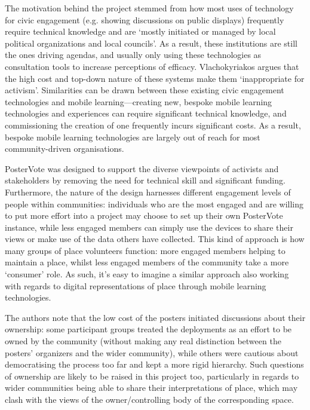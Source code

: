 The motivation behind the project stemmed from how most uses of technology for civic engagement (e.g. showing discussions on public displays) frequently require technical knowledge and are `mostly initiated or managed by local political organizations and local councils'. As a result, these institutions are still the ones driving agendas, and usually only using these technologies as consultation tools to increase perceptions of efficacy. Vlachokyriakos argues that the high cost and top-down nature of these systems make them `inappropriate for activism'. Similarities can be drawn between these existing civic engagement technologies and mobile learning---creating new, bespoke mobile learning technologies and experiences can require significant technical knowledge, and commissioning the creation of one frequently incurs significant costs. As a result, bespoke mobile learning technologies are largely out of reach for most community-driven organisations.

PosterVote was designed to support the diverse viewpoints of activists and stakeholders by removing the need for technical skill and significant funding. Furthermore, the nature of the design harnesses different engagement levels of people within communities: individuals who are the most engaged and are willing to put more effort into a project may choose to set up their own PosterVote instance, while less engaged members can simply use the devices to share their views or make use of the data others have collected. This kind of approach is how many groups of place volunteers function: more engaged members helping to maintain a place, whilst less engaged members of the community take a more `consumer' role. As such, it's easy to imagine a similar approach also working with regards to digital representations of place through mobile learning technologies.

The authors note that the low cost of the posters initiated discussions about their ownership: some participant groups treated the deployments as an effort to be owned by the community (without making any real distinction between the posters' organizers and the wider community), while others were cautious about democratising the process too far and kept a more rigid hierarchy. Such questions of ownership are likely to be raised in this project too, particularly in regards to wider communities being able to share their interpretations of place, which may clash with the views of the owner/controlling body of the corresponding space.

